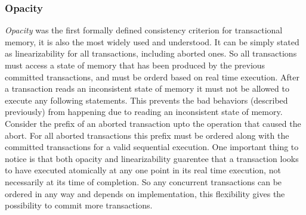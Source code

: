 \subsubsection{Opacity}
\emph{Opacity} \cite{LPD-CONF-2007-017} was the first formally defined consistency criterion for transactional memory, it is also the most widely used and understood.
It can be simply stated as linearizability for all transactions, including aborted ones.  So all transactions must access a state of memory that has been produced by the previous committed transactions, and must be orderd based on real time execution.
After a transaction reads an inconsistent state of memory it must not be allowed to execute any following statements.
This prevents the bad behaviors (described previously) from happening due to reading an inconsistent state of memory.
Consider the prefix of an aborted transaction upto the operation that caused the abort.
For all aborted transactions this prefix must be ordered along with the committed transactions for a valid sequential execution.
One important thing to notice is that both opacity and linearizability guarentee that a transaction looks to have executed atomically at any one point in its real time execution, not necessarily at its time of completion.
So any concurrent transactions can be ordered in any way and depends on implementation, this flexibility gives the possibility to commit more transactions.

